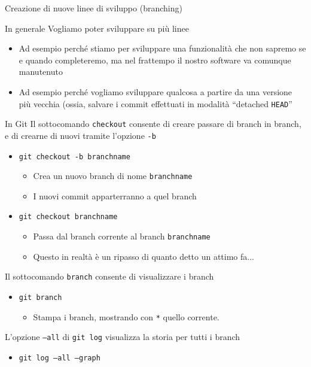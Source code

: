 \documentclass[presentation]{beamer}
\begin{document}
\begin{frame}{Creazione di nuove linee di sviluppo (branching)}
	\begin{block}{In generale}
		Vogliamo poter sviluppare su più linee
		\begin{itemize}
			\item Ad esempio perché stiamo per sviluppare una funzionalità che non sapremo se e quando completeremo, ma nel frattempo il nostro software va comunque manutenuto
			\item Ad esempio perché vogliamo sviluppare qualcosa a partire da una versione più vecchia (ossia, salvare i commit effettuati in modalità ``detached \texttt{HEAD}''
		\end{itemize}
	\end{block}
	\begin{block}{In Git}
		Il sottocomando \texttt{checkout} consente di creare passare di branch in branch, e di crearne di nuovi tramite l'opzione \texttt{-b}
		\begin{itemize}
			\item \texttt{git checkout -b branchname}
			\begin{itemize}
				\item Crea un nuovo branch di nome \texttt{branchname}
				\item I nuovi commit apparterranno a quel branch
			\end{itemize}
			\item \texttt{git checkout branchname}
			\begin{itemize}
				\item Passa dal branch corrente al branch \texttt{branchname}
				\item Questo in realtà è un ripasso di quanto detto un attimo fa...
			\end{itemize}
		\end{itemize}
		Il sottocomando \texttt{branch} consente di visualizzare i branch
		\begin{itemize}
			\item \texttt{git branch}
			\begin{itemize}
				\item Stampa i branch, mostrando con \texttt{*} quello corrente.
			\end{itemize}
		\end{itemize}
		L'opzione \texttt{--all} di \texttt{git log} visualizza la storia per tutti i branch
		\begin{itemize}
			\item \texttt{git log --all --graph}

\end{itemize}
\end{block}
\end{frame}
\end{document}
